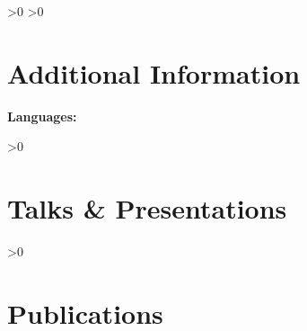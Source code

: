 

\ifnum\cvLanguagesCount>0
\ifnum\cvLanguagesPrinted>0
\section{\textbf{Additional Information}}
\vspace{-0.4mm}
\small{
\textbf{Languages:} \cvLanguagesInline
}
\fi
\fi

%
\cvAutoSections

\ifnum\cvTalksCount>0
\section{\textbf{Talks \& Presentations} \hfill \textcolor{darkblue}{\scriptsize \cvTalksKey}}

\begin{refsection}
\nocite{*}

\cvTalksSections

\end{refsection}
\fi

\ifnum\cvPublicationsCount>0
\section{\textbf{Publications} \hfill \textcolor{darkblue}{\scriptsize \cvPublicationsKey}}

\begin{refsection}
\nocite{*}

\cvPublicationsSections

\end{refsection}
\fi

\vspace{5mm}
{\footnotesize
\cvFooter
}


